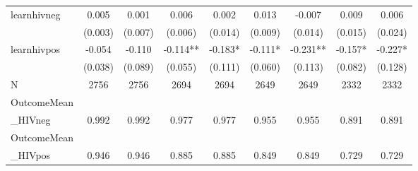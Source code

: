 \begin{tabular}{lcccccccc}
\hline
learnhivneg & 0.005 & 0.001 & 0.006 & 0.002 & 0.013 & -0.007 & 0.009 & 0.006 \\
 & (0.003) & (0.007) & (0.006) & (0.014) & (0.009) & (0.014) & (0.015) & (0.024) \\
learnhivpos & -0.054 & -0.110 & -0.114** & -0.183* & -0.111* & -0.231** & -0.157* & -0.227* \\
 & (0.038) & (0.089) & (0.055) & (0.111) & (0.060) & (0.113) & (0.082) & (0.128) \\
\hline
N & 2756 & 2756 & 2694 & 2694 & 2649 & 2649 & 2332 & 2332 \\
OutcomeMean\\_HIVneg & 0.992 & 0.992 & 0.977 & 0.977 & 0.955 & 0.955 & 0.891 & 0.891 \\
OutcomeMean\\_HIVpos & 0.946 & 0.946 & 0.885 & 0.885 & 0.849 & 0.849 & 0.729 & 0.729 \\
\hline
\end{tabular}
